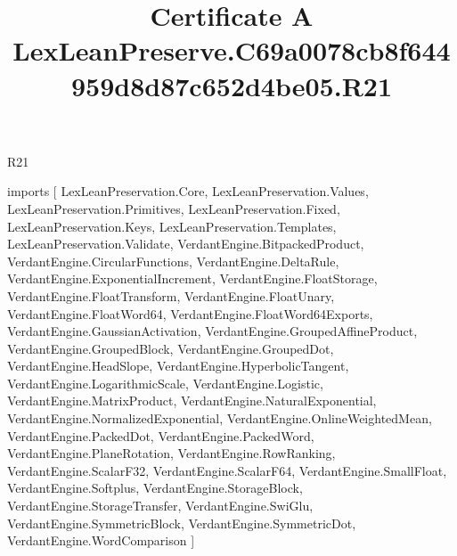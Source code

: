 \begin{lexlean}{R21}
\title{Certificate A LexLeanPreserve.C69a0078cb8f644959d8d87c652d4be05.R21}
\begin{coremodule}
imports [
  LexLeanPreservation.Core,
  LexLeanPreservation.Values,
  LexLeanPreservation.Primitives,
  LexLeanPreservation.Fixed,
  LexLeanPreservation.Keys,
  LexLeanPreservation.Templates,
  LexLeanPreservation.Validate,
  VerdantEngine.BitpackedProduct,
  VerdantEngine.CircularFunctions,
  VerdantEngine.DeltaRule,
  VerdantEngine.ExponentialIncrement,
  VerdantEngine.FloatStorage,
  VerdantEngine.FloatTransform,
  VerdantEngine.FloatUnary,
  VerdantEngine.FloatWord64,
  VerdantEngine.FloatWord64Exports,
  VerdantEngine.GaussianActivation,
  VerdantEngine.GroupedAffineProduct,
  VerdantEngine.GroupedBlock,
  VerdantEngine.GroupedDot,
  VerdantEngine.HeadSlope,
  VerdantEngine.HyperbolicTangent,
  VerdantEngine.LogarithmicScale,
  VerdantEngine.Logistic,
  VerdantEngine.MatrixProduct,
  VerdantEngine.NaturalExponential,
  VerdantEngine.NormalizedExponential,
  VerdantEngine.OnlineWeightedMean,
  VerdantEngine.PackedDot,
  VerdantEngine.PackedWord,
  VerdantEngine.PlaneRotation,
  VerdantEngine.RowRanking,
  VerdantEngine.ScalarF32,
  VerdantEngine.ScalarF64,
  VerdantEngine.SmallFloat,
  VerdantEngine.Softplus,
  VerdantEngine.StorageBlock,
  VerdantEngine.StorageTransfer,
  VerdantEngine.SwiGlu,
  VerdantEngine.SymmetricBlock,
  VerdantEngine.SymmetricDot,
  VerdantEngine.WordComparison
]


\end{coremodule}
\end{lexlean}
